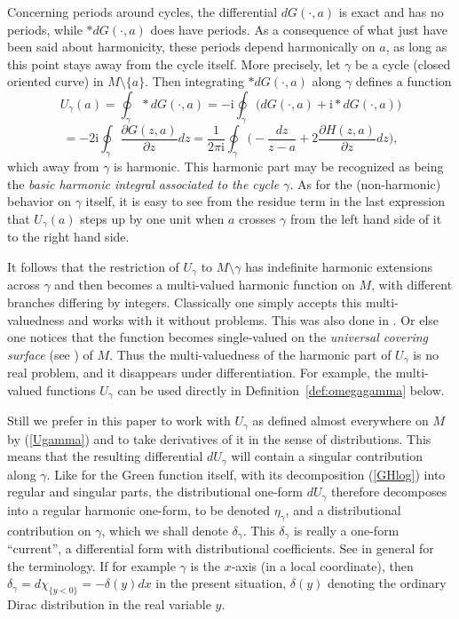 \documentclass[reqno,12pt]{article}
\theoremstyle{plain}
\theoremstyle{definition}
\numberwithin{equation}{section}
\numberwithin{figure}{section}
\def\I{\mathrm{i}}
\begin{document}
Concerning periods around cycles, the differential $dG(\cdot,a)$ is exact and has no periods,
while $*dG(\cdot,a)$ does have periods. 
As a consequence of what just have been said about harmonicity,
these periods depend harmonically on $a$, as long as this point stays away from the cycle itself. 
More precisely, let $\gamma$ be a cycle (closed oriented curve)
in $M\setminus\{a\}$. Then integrating $*dG(\cdot,a)$ along $\gamma$ defines a function 
\begin{equation}\label{Ugamma}
U_\gamma(a)=\oint_\gamma *dG(\cdot,a)=-\I\oint_\gamma \big(dG(\cdot,a)+\I*dG(\cdot,a)\big)
\end{equation}
$$
=-2\I \oint_\gamma\frac{\partial G(z,a)}{\partial z}dz
=\frac{1}{2\pi\I}\oint_\gamma\Big(-\frac{dz}{z-a}+2\frac{\partial H(z,a)}{\partial z}dz\Big),
$$
which away from $\gamma$ is harmonic. This harmonic part may be recognized as being the
{\it basic harmonic integral associated to the cycle $\gamma$}.
As for the (non-harmonic) behavior on $\gamma$ itself,
it is easy to see from the residue term in the last expression
that $U_\gamma (a)$ steps up by one unit when $a$ crosses $\gamma$
from the left hand side of it to the right hand side. 

It follows that the restriction of $U_\gamma$ to $M\setminus \gamma$ has indefinite
harmonic  extensions across $\gamma$ and then becomes a multi-valued harmonic
function on $M$, with different branches differing by integers. Classically one simply
accepts this multi-valuedness and works with it without problems. This was also done in 
\cite{Gustafsson-2022a, Grotta-Ragazzo-Gustafsson-Koiller-2024}.  
Or else one notices that the function becomes single-valued on the {\it universal covering surface}
(see \cite{Ahlfors-1973}) of $M$. 
Thus the multi-valuedness of the harmonic part of $U_\gamma$ is no real problem, and it disappears 
under differentiation. For example, the multi-valued functions $U_\gamma$ can be used directly in 
Definition~\ref{def:omegagamma} below.

Still we prefer in this paper to work with $U_\gamma$ as defined almost everywhere on 
$M$ by (\ref{Ugamma}) and to take derivatives of it in the sense of distributions. 
This means that
the resulting differential $dU_\gamma$ will contain a singular contribution along $\gamma$.  
Like for the Green function itself, with its decomposition (\ref{GHlog}) into regular and singular parts,
the distributional one-form $dU_\gamma$ therefore decomposes into a regular harmonic one-form, 
to be denoted $\eta_\gamma$, 
and a distributional contribution on $\gamma$, which we shall denote $\delta_\gamma$. This $\delta_\gamma$ is really
a one-form ``current'', a differential form with distributional coefficients. 
See in general \cite{deRham-1984, Federer-1969, Griffiths-Harris-1978} for the terminology. 
If for example $\gamma$ is the $x$-axis (in a local coordinate), then 
 $\delta_\gamma=d\chi_{\{y<0\}}=-\delta(y)dx$ in the present situation, $\delta(y)$ denoting the ordinary Dirac
distribution in the real variable $y$.
\end{document}
